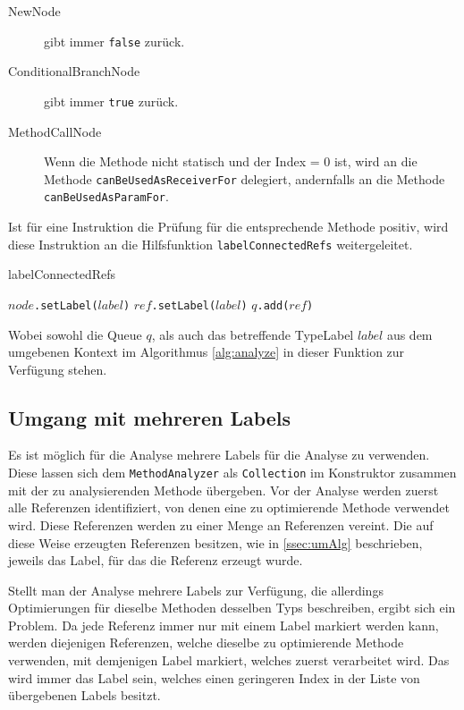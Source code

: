 \begin{description}
	\item[NewNode] gibt immer \texttt{false} zurück.
	\item[ConditionalBranchNode] gibt immer \texttt{true} zurück.
	\item[MethodCallNode] Wenn die Methode nicht statisch und der Index = 0 ist, wird an die Methode
	\texttt{canBeUsedAsReceiverFor} delegiert, andernfalls an die Methode \texttt{canBeUsedAsParamFor}.
\end{description}

Ist für eine Instruktion die Prüfung für die entsprechende Methode positiv, wird diese 
Instruktion an die Hilfsfunktion \texttt{labelConnectedRefs} weitergeleitet.

\begin{algorithm}[H]
	\caption{labelConnectedRefs}\label{alg:labelConnRefs}
	\begin{algorithmic}[1]
		\STATE \texttt{$node$.setLabel($label$)}
				\STATE \texttt{$ref$.setLabel($label$)}
				\STATE \texttt{$q$.add($ref$)}
			\ENDIF 
		\ENDFOR
	\end{algorithmic}
\end{algorithm}

Wobei sowohl die Queue $q$, als auch das betreffende TypeLabel $label$ aus dem umgebenen Kontext
im Algorithmus \ref{alg:analyze} in dieser Funktion zur Verfügung stehen. 

\subsection{Umgang mit mehreren Labels}

Es ist möglich für die Analyse mehrere Labels für die Analyse zu verwenden. Diese lassen
sich dem \texttt{MethodAnalyzer} als \texttt{Collection} im Konstruktor zusammen 
mit der zu analysierenden Methode übergeben. Vor der Analyse werden zuerst alle Referenzen 
identifiziert, von denen eine zu optimierende Methode verwendet wird. Diese Referenzen werden 
zu einer Menge an Referenzen vereint. Die auf diese Weise erzeugten Referenzen besitzen, 
wie in \ref{ssec:umAlg} beschrieben, jeweils das Label, für das die Referenz erzeugt wurde.

Stellt man der Analyse mehrere Labels zur Verfügung, die allerdings Optimierungen für 
dieselbe Methoden desselben Typs beschreiben, ergibt sich ein Problem. Da jede 
Referenz immer nur mit einem Label markiert werden kann, werden diejenigen Referenzen, 
welche dieselbe zu optimierende Methode verwenden, mit demjenigen Label markiert, welches 
zuerst verarbeitet wird. Das wird immer das Label sein, welches einen geringeren Index in 
der Liste von übergebenen Labels besitzt. 

